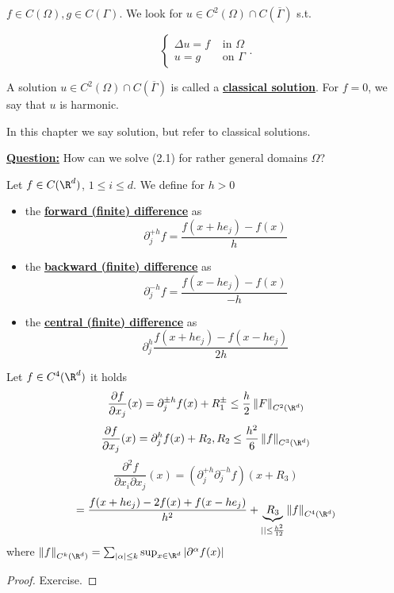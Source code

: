 $f\in C(\Omega),g\in C(\Gamma)$. We look for $u\in C^2(\Omega)\cap C(\overline{\Gamma})$ s.t.

\[\begin{cases}
    \Delta u = f & \text{ in } \Omega\\
    u=g & \text{ on } \Gamma
\end{cases}.\]

\begin{definition}
    A solution $u\in C^2(\Omega)\cap C(\overline{\Gamma})$ is called a \underline{\textbf{classical solution}}. For $f=0$, we say that $u$ is harmonic.
\end{definition}

In this chapter we say solution, but refer to classical solutions.

\underline{\textbf{Question:}} How can we solve (2.1) for rather general domains $\Omega$?

\begin{definition}
    Let $f\in C(\R^d)$, $1\leq i\leq d$. We define for $h>0$
    \begin{itemize}
        \item the \underline{\textbf{forward (finite) difference}} as \[\partial_j^{+h}f=\frac{f(x+he_j)-f(x)}{h}\]
        \item the \underline{\textbf{backward (finite) difference}} as \[\partial_j^{-h}f=\frac{f(x-he_j)-f(x)}{-h}\]
        \item the \underline{\textbf{central (finite) difference}} as \[\partial_j^h \frac{f(x+he_j)-f(x-he_j)}{2h}\]
    \end{itemize}
\end{definition}

\begin{lemma}
    Let $f\in C^4(\R^d)$ it holds 
    \[\frac{\partial f}{\partial x_j}(x)=\partial_j^{\pm h}f(x)+R_1^{\pm} \leq \frac{h}{2}\left\Vert F \right\Vert_{C^2(\R^d)}\]
    \[\frac{\partial f}{\partial x_j}(x)=\partial_j^{h}f(x)+R_2, R_2\leq \frac{h^2}{6}\left\Vert f \right\Vert_{C^3(\R^d)}\]
    \[\frac{\partial^2 f}{\partial x_i \partial x_j}(x)=(\partial_j^{+h}\partial_j^{-h} f)(x+R_3)\]
    \[=\frac{f(x+he_j)-2f(x)+f(x-he_j)}{h^2}+\underbrace{R_3}_{||\leq \frac{h^2}{12}}\left\Vert f \right\Vert_{C^4(\R^d)}\]
    where $\left\Vert f \right\Vert_{C^k(\R^d)}=\sum_{|\alpha|\leq k} \sup_{x\in \R^d} |\partial^{\alpha} f(x)|$
\end{lemma}

\begin{proof}
Exercise.    
\end{proof}


